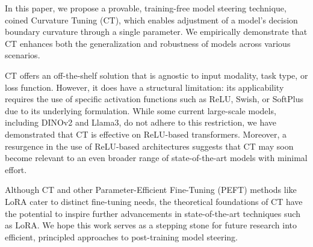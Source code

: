 In this paper, we propose a provable, training-free model steering technique, coined Curvature Tuning (CT), which enables adjustment of a model's decision boundary curvature through a single parameter. We empirically demonstrate that CT enhances both the generalization and robustness of models across various scenarios.

CT offers an off-the-shelf solution that is agnostic to input modality, task type, or loss function. However, it does have a structural limitation: its applicability requires the use of specific activation functions such as ReLU, Swish, or SoftPlus due to its underlying formulation. While some current large-scale models, including DINOv2 and Llama3, do not adhere to this restriction, we have demonstrated that CT is effective on ReLU-based transformers. Moreover, a resurgence in the use of ReLU-based architectures \cite{mirzadeh2023relullm} suggests that CT may soon become relevant to an even broader range of state-of-the-art models with minimal effort.

Although CT and other Parameter-Efficient Fine-Tuning (PEFT) methods like LoRA cater to distinct fine-tuning needs, the theoretical foundations of CT have the potential to inspire further advancements in state-of-the-art techniques such as LoRA. We hope this work serves as a stepping stone for future research into efficient, principled approaches to post-training model steering.